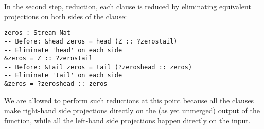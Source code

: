 

In the second step, reduction, each clause is reduced by eliminating equivalent
projections on both sides of the clause:
\begin{lstlisting}[mathescape,title=\idrisBlock]
zeros : Stream Nat
-- Before: &head zeros = head (Z :: ?zerostail)
-- Eliminate 'head' on each side
&zeros = Z :: ?zerostail
-- Before: &tail zeros = tail (?zeroshead :: zeros)
-- Eliminate 'tail' on each side
&zeros = ?zeroshead :: zeros
\end{lstlisting}
We are allowed to perform such reductions at this point because all the clauses
make right-hand side projections directly on the (as yet unmerged) output of the
function, while all the left-hand side projections happen directly on the input.

